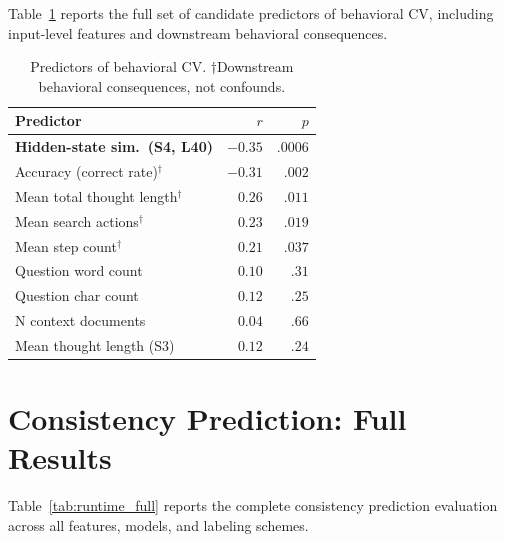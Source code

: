 \documentclass{article}
\begin{document}
Table~\ref{tab:baselines_full} reports the full set of candidate predictors of behavioral CV, including input-level features and downstream behavioral consequences.

\begin{table}[ht]
\caption{Predictors of behavioral CV. $\dagger$Downstream behavioral consequences, not confounds.}
\label{tab:baselines_full}
\centering
\small
\begin{tabular}{lrr}
\toprule
Predictor & $r$ & $p$ \\
\midrule
\textbf{Hidden-state sim.\ (S4, L40)} & $\mathbf{-0.35}$ & $\mathbf{.0006}$ \\
\midrule
Accuracy (correct rate)$^\dagger$ & $-0.31$ & $.002$ \\
Mean total thought length$^\dagger$ & $0.26$ & $.011$ \\
Mean search actions$^\dagger$ & $0.23$ & $.019$ \\
Mean step count$^\dagger$ & $0.21$ & $.037$ \\
\midrule
Question word count & $0.10$ & $.31$ \\
Question char count & $0.12$ & $.25$ \\
N context documents & $0.04$ & $.66$ \\
Mean thought length (S3) & $0.12$ & $.24$ \\
\bottomrule
\end{tabular}
\end{table}

\section{Consistency Prediction: Full Results}
\label{app:runtime}

Table~\ref{tab:runtime_full} reports the complete consistency prediction evaluation across all features, models, and labeling schemes.
\end{document}
